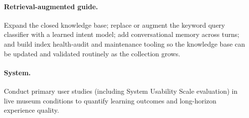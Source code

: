 \paragraph{Retrieval-augmented guide.} Expand the closed knowledge base; replace or
augment the keyword query classifier with a learned intent model; add conversational
memory across turns; and build index health-audit and maintenance tooling so the
knowledge base can be updated and validated routinely as the collection grows.

\paragraph{System.} Conduct primary user studies (including System Usability Scale evaluation) in live museum
conditions to quantify learning outcomes and long-horizon experience quality.

